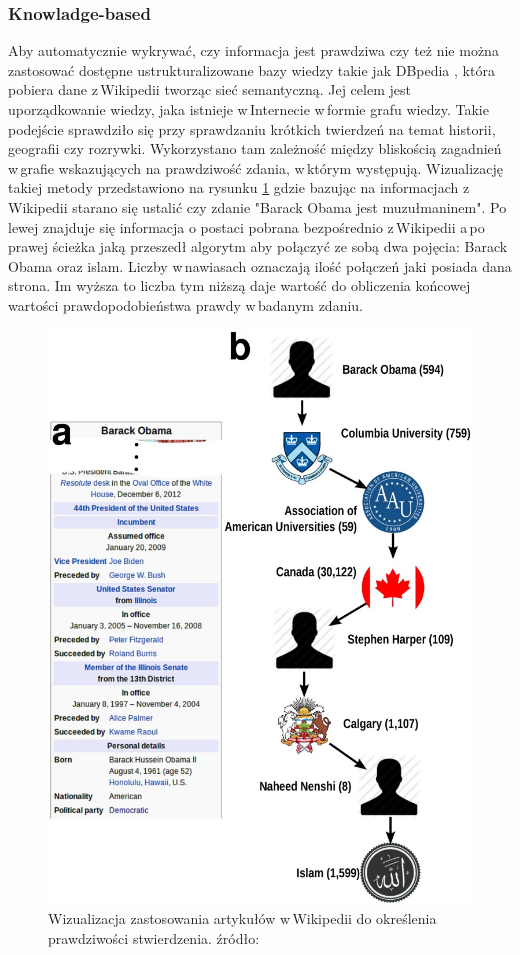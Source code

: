 \subsubsection{Knowladge-based}
Aby automatycznie wykrywać, czy informacja jest prawdziwa czy też nie można zastosować dostępne ustrukturalizowane bazy wiedzy takie jak DBpedia , która pobiera dane z\,Wikipedii tworząc sieć semantyczną. Jej celem jest uporządkowanie wiedzy, jaka istnieje w\,Internecie w\,formie grafu wiedzy.  Takie podejście sprawdziło się przy sprawdzaniu krótkich twierdzeń na temat historii, geografii czy rozrywki\cite{ciampaglia2015computational}. Wykorzystano tam zależność między bliskością zagadnień w\,grafie wskazujących na prawdziwość zdania, w\,którym występują. Wizualizację takiej metody przedstawiono na rysunku \ref{fig:barackObama} gdzie bazując na informacjach z\,Wikipedii starano się ustalić czy zdanie "Barack Obama jest muzułmaninem". Po lewej znajduje się informacja o postaci pobrana bezpośrednio z\,Wikipedii a\,po prawej ścieżka jaką przeszedł algorytm aby połączyć ze sobą dwa pojęcia: Barack Obama oraz islam. Liczby w\,nawiasach oznaczają ilość połączeń jaki posiada dana strona. Im wyższa to liczba tym niższą daje wartość do obliczenia końcowej wartości prawdopodobieństwa prawdy w\,badanym zdaniu. 

\begin{figure}[!h]
	\centering \includegraphics[width=0.5\linewidth]{img/barackObamaIsAMuslimNew.jpg}
	\caption{Wizualizacja zastosowania artykułów w\,Wikipedii do określenia prawdziwości stwierdzenia. źródło: \cite{ciampaglia2015computational}}
	\label{fig:barackObama}
\end{figure}
\par

